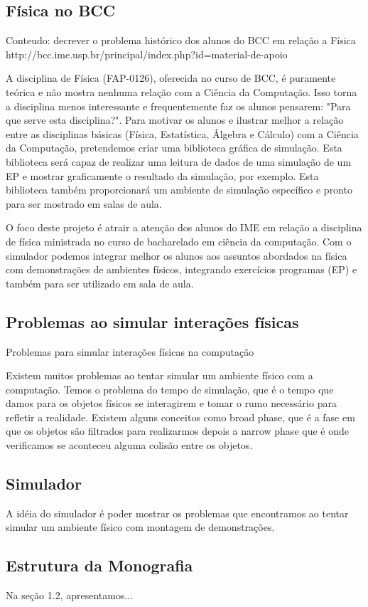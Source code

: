 
\subsection{Física no BCC}
    Conteudo: decrever o problema histórico dos alunos do BCC
               em relação a Física
               http://bcc.ime.usp.br/principal/index.php?id=material-de-apoio

A disciplina de Física (FAP-0126), oferecida no curso de BCC, é puramente teórica e não mostra nenhuma relação com a Ciência da Computação. Isso torna a disciplina menos interessante e frequentemente faz os alunos pensarem: "Para que serve esta disciplina?".
Para motivar os alunos e ilustrar melhor a relação entre as disciplinas básicas (Física, Estatística, Álgebra e Cálculo) com a Ciência da Computação, pretendemos criar uma biblioteca gráfica de simulação. Esta biblioteca será capaz de realizar uma leitura de dados de uma simulação de um EP e mostrar graficamente o resultado da simulação, por exemplo.
Esta biblioteca também proporcionará um ambiente de simulação específico e pronto para ser mostrado em salas de aula.

O foco deste projeto é atrair a atenção dos alunos do IME em relação a disciplina de física ministrada no curso de bacharelado em ciência da computação.
Com o simulador podemos integrar melhor os alunos aos assuntos abordados na física com demonstrações de ambientes físicos, 
integrando exercícios programas (EP) e também para ser utilizado em sala de aula.

\subsection{Problemas ao simular interações físicas}
    Problemas para simular interações físicas na computação

Existem muitos problemas ao tentar simular um ambiente físico com a computação. Temos o problema do tempo de simulação, 
que é o tempo que damos para os objetos físicos se interagirem e tomar o rumo necessário para refletir a realidade.
Existem alguns conceitos como broad phase, que é a fase em que os objetos são filtrados para realizarmos depois a narrow phase que é onde verificamos se aconteceu 
alguma colisão entre os objetos.

\subsection{Simulador}

A idéia do simulador é poder mostrar os problemas que encontramos ao tentar simular um ambiente físico com montagem de demonstrações. 

\subsection{Estrutura da Monografia}

Na seção 1.2, apresentamos...
